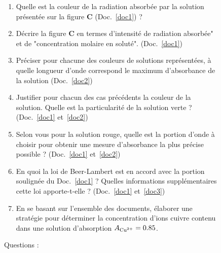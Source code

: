 \documentclass[a4paper,12pt,fleqn]{article}%
\begin{document}
	\begin{figure}[h!]
		\caption{Questions :}
		\begin{enumerate}
			\item Quelle est la couleur de la radiation absorbée par la solution présentée sur la figure \textbf{C} (Doc.~\ref{doc1}) ?
			\item Décrire la figure \textbf{C} en termes d'intensité de radiation absorbée" et de "concentration molaire en soluté". (Doc.~\ref{doc1})
			\item Préciser pour chacune des couleurs de solutions représentées, à quelle longueur d'onde correspond le maximum d'absorbance de la solution (Doc.~\ref{doc2})
			\item Justifier pour chacun des cas précédents la couleur de la solution. Quelle est la particularité de la solution verte ? (Doc.~\ref{doc1} et~\ref{doc2})
			\item Selon vous pour la solution rouge, quelle est la portion d'onde à choisir pour obtenir une mesure d'absorbance la plus précise possible ? (Doc.~\ref{doc1} et~\ref{doc2})
			\item En quoi la loi de Beer-Lambert est en accord avec la portion soulignée du Doc.~\ref{doc1} ? Quelles informations supplémentaires cette loi apporte-t-elle ? (Doc.~\ref{doc1} et~\ref{doc3})
			\item En se basant sur l'ensemble des documents, élaborer une stratégie pour déterminer la concentration d'ions cuivre  contenu dans une solution d'absorption $A_{\ce{Cu^{2+}}}  = 0.85$.
		\end{enumerate}
	\end{figure}
	
\end{document}
